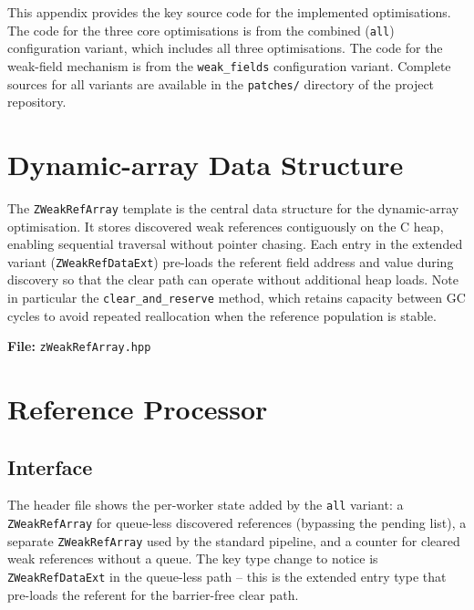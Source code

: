 This appendix provides the key source code for the implemented optimisations. The code for the three core optimisations is from the combined (\texttt{all}) configuration variant, which includes all three optimisations. The code for the weak-field mechanism is from the \texttt{weak\_fields} configuration variant. Complete sources for all variants are available in the \texttt{patches/} directory of the project repository.

\lstset{basicstyle=\ttfamily\footnotesize,columns=flexible}

\section{Dynamic-array Data Structure}
\label{app:source-dyn}

The \texttt{ZWeakRefArray} template is the central data structure for the dynamic-array optimisation. It stores discovered weak references contiguously on the C heap, enabling sequential traversal without pointer chasing. Each entry in the extended variant (\texttt{ZWeakRefDataExt}) pre-loads the referent field address and value during discovery so that the clear path can operate without additional heap loads. Note in particular the \texttt{clear\_and\_reserve} method, which retains capacity between \ac{GC} cycles to avoid repeated reallocation when the reference population is stable.

\noindent\textbf{File:} \texttt{zWeakRefArray.hpp}



\section{Reference Processor}
\label{app:source-refproc}

\subsection{Interface}
\label{app:source-refproc-iface}

The header file shows the per-worker state added by the \texttt{all} variant: a \texttt{ZWeakRefArray} for queue-less discovered references (bypassing the pending list), a separate \texttt{ZWeakRefArray} used by the standard pipeline, and a counter for cleared weak references without a queue. The key type change to notice is \texttt{ZWeakRefDataExt} in the queue-less path -- this is the extended entry type that pre-loads the referent for the barrier-free clear path.

